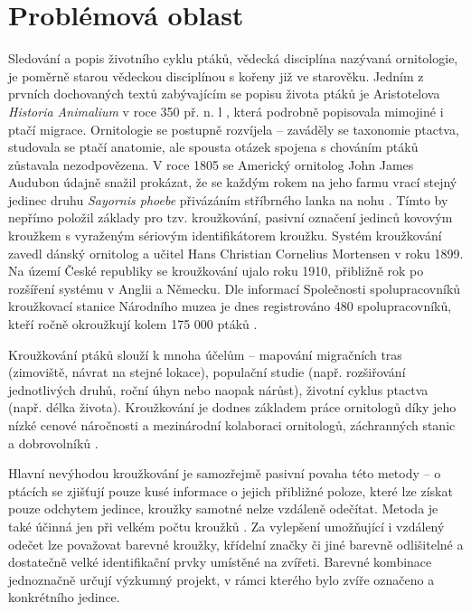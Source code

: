 
\chapter{Problémová oblast}{\tiny }

Sledování a popis životního cyklu ptáků, vědecká disciplína nazývaná ornitologie, je poměrně starou vědeckou disciplínou s kořeny již ve starověku. Jedním z prvních dochovaných textů zabývajícím se popisu života ptáků je Aristotelova \emph{Historia Animalium} v roce 350 př. n. l \cite{historiaAnimalium}, která podrobně popisovala mimojiné i ptačí migrace. Ornitologie se postupně rozvíjela -- zaváděly se taxonomie ptactva, studovala se ptačí anatomie, ale spousta otázek spojena s chováním ptáků zůstavala nezodpovězena. V roce 1805 se Americký ornitolog John James Audubon údajně snažil prokázat, že se každým rokem na jeho farmu vrací stejný jedinec druhu \emph{Sayornis phoebe} přivázáním stříbrného lanka na nohu \cite{halley2018audubon}. Tímto by nepřímo položil základy pro tzv. kroužkování, pasivní označení jedinců kovovým kroužkem s vyraženým sériovým identifikátorem kroužku. Systém kroužkování zavedl dánský ornitolog a učitel Hans Christian Cornelius Mortensen v roku 1899. Na území České republiky se kroužkování ujalo roku 1910, přibližně rok po rozšíření systému v Anglii a Německu. Dle informací Společnosti spolupracovníků kroužkovací stanice Národního muzea je dnes registrováno 480 spolupracovníků, kteří ročně okroužkují kolem 175 000 ptáků \cite{krouzkovaniPtakuHistorie}.

Kroužkování ptáků slouží k mnoha účelům -- mapování migračních tras (zimoviště, návrat na stejné lokace), populační studie (např. rozšiřování jednotlivých druhů, roční úhyn nebo naopak nárůst), životní cyklus ptactva (např. délka života). Kroužkování je dodnes základem práce ornitologů díky jeho nízké cenové náročnosti a mezinárodní kolaboraci ornitologů, záchranných stanic a dobrovolníků \cite{krouzkovaniPtaku}. 

Hlavní nevýhodou kroužkování je samozřejmě pasivní povaha této metody -- o ptácích se zjišťují pouze kusé informace o jejich přibližné poloze, které lze získat pouze odchytem jedince, kroužky samotné nelze vzdáleně odečítat. Metoda je také účinná jen při velkém počtu kroužků \cite{sokolov2011modern}. Za vylepšení umožňující i vzdálený odečet lze považovat barevné kroužky, křídelní značky či jiné barevně odlišitelné a dostatečně velké identifikační prvky umístěné na zvířeti. Barevné kombinace jednoznačně určují výzkumný projekt, v rámci kterého bylo zvíře označeno a konkrétního jedince. 

